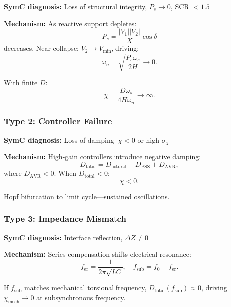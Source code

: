 \documentclass[11pt,letterpaper]{article}
\newcommand{\symchi}{\chi}
\begin{document}
\textbf{SymC diagnosis:} Loss of structural integrity, $P_s \to 0$, SCR $< 1.5$

\textbf{Mechanism:} As reactive support depletes:
\begin{equation}
P_s = \frac{|V_1||V_2|}{X}\cos\delta
\end{equation}
decreases. Near collapse: $V_2 \to V_{\min}$, driving:
\begin{equation}
\omega_n = \sqrt{\frac{P_s\omega_s}{2H}} \to 0.
\end{equation}

With finite $D$:
\begin{equation}
\symchi = \frac{D\omega_s}{4H\omega_n} \to \infty.
\end{equation}

\subsubsection{Type 2: Controller Failure}

\textbf{SymC diagnosis:} Loss of damping, $\symchi < 0$ or high $\sigma_\symchi$

\textbf{Mechanism:} High-gain controllers introduce negative damping:
\begin{equation}
D_{\text{total}} = D_{\text{natural}} + D_{\text{PSS}} + D_{\text{AVR}},
\end{equation}
where $D_{\text{AVR}} < 0$. When $D_{\text{total}} < 0$:
\begin{equation}
\symchi < 0.
\end{equation}

Hopf bifurcation to limit cycle—sustained oscillations.

\subsubsection{Type 3: Impedance Mismatch}

\textbf{SymC diagnosis:} Interface reflection, $\Delta Z \neq 0$

\textbf{Mechanism:} Series compensation shifts electrical resonance:
\begin{equation}
f_{\text{er}} = \frac{1}{2\pi\sqrt{LC}}, \quad f_{\text{sub}} = f_0 - f_{\text{er}}.
\end{equation}

If $f_{\text{sub}}$ matches mechanical torsional frequency, $D_{\text{total}}(f_{\text{sub}}) \approx 0$, driving $\symchi_{\text{mech}} \to 0$ at subsynchronous frequency.
\end{document}
